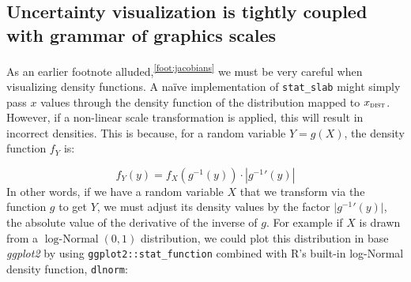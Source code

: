 \documentclass[journal]{vgtc}              %
\begin{document}



\subsection{Uncertainty visualization is tightly coupled with grammar of graphics scales}
\label{sec:jacobians}

As an earlier footnote alluded,\textsuperscript{\ref{foot:jacobians}}   we must be very careful when visualizing density functions. A na\"{i}ve implementation of \texttt{stat\_slab} might simply pass $x$ values through the density function of the distribution mapped to $x_\textsc{dist}$. However, if a non-linear scale transformation is applied, this will result in incorrect densities. This is because, for a random variable $Y = g(X)$, the density function $f_Y$ is:

\[
f_Y(y) = f_X\left(g^{-1}(y)\right) \cdot \left| {g^{-1}}'(y) \right|
\]
In other words, if we have a random variable $X$ that we transform via the function $g$ to get $Y$, we must adjust its density values by the factor $\lvert {g^{-1}}'(y) \rvert$, the absolute value of the derivative of the inverse of $g$. For example if $X$ is drawn from a $\operatorname{log-Normal}(0, 1)$ distribution, we could plot this distribution in base \textit{ggplot2} by using \texttt{ggplot2::stat\_function} combined with R's built-in log-Normal density function, \texttt{dlnorm}:
\end{document}
